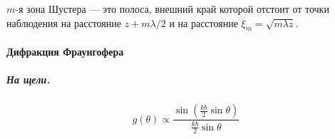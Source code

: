 \documentclass[12pt]{article}
\begin{document}
	\begin{figure}
	
		\begin{minipage}[h]{0.49\linewidth}
			
		\end{minipage}
		\hfill
		\begin{minipage}[h]{0.49\linewidth}
		\end{minipage}
		
	\end{figure}
	
	$m$-я зона Шустера --- это полоса, внешний край которой отстоит от точки наблюдения на расстояние $z + m\lambda/2$ и на расстояние $\xi_m = \sqrt{m\lambda z}$.
	
	\paragraph{Дифракция Фраунгофера}
	\subparagraph{На щели.}
	$$g(\theta) \propto \dfrac{\sin (\frac{kb}{2}\sin \theta)}{\frac{kb}{2}\sin\theta}$$
	
\end{document}
